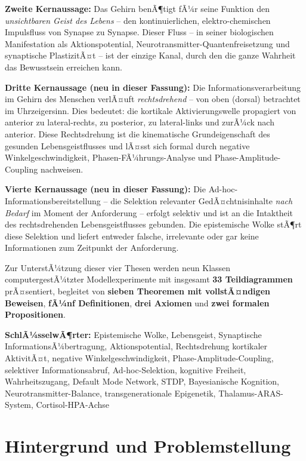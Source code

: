 ﻿\documentclass[12pt,a4paper]{report}
\theoremstyle{plain}
\theoremstyle{definition}
\theoremstyle{remark}
\begin{document}
	\textbf{Zweite Kernaussage:} Das Gehirn benÃ¶tigt fÃ¼r seine Funktion
	den \emph{unsichtbaren Geist des Lebens} -- den kontinuierlichen, elektro-chemischen
	Impulsfluss von Synapse zu Synapse. Dieser Fluss -- in seiner biologischen
	Manifestation als Aktionspotential, Neurotransmitter-Quantenfreisetzung und
	synaptische PlastizitÃ¤t -- ist der einzige Kanal, durch den die ganze
	Wahrheit das Bewusstsein erreichen kann.
	
	\textbf{Dritte Kernaussage (neu in dieser Fassung):} Die Informationsverarbeitung
	im Gehirn des Menschen verlÃ¤uft \emph{rechtsdrehend} -- von oben (dorsal)
	betrachtet im Uhrzeigersinn. Dies bedeutet: die kortikale Aktivierungswelle
	propagiert von anterior zu lateral-rechts, zu posterior, zu lateral-links
	und zurÃ¼ck nach anterior. Diese Rechtsdrehung ist die kinematische
	Grundeigenschaft des gesunden Lebensgeistflusses und lÃ¤sst sich formal
	durch negative Winkelgeschwindigkeit, Phasen-FÃ¼hrungs-Analyse und
	Phase-Amplitude-Coupling nachweisen.
	
	\textbf{Vierte Kernaussage (neu in dieser Fassung):} Die
	Ad-hoc-Informationsbereitstellung -- die Selektion relevanter GedÃ¤chtnisinhalte
	\emph{nach Bedarf} im Moment der Anforderung -- erfolgt selektiv und ist
	an die Intaktheit des rechtsdrehenden Lebensgeistflusses gebunden. Die
	epistemische Wolke stÃ¶rt diese Selektion und liefert entweder falsche,
	irrelevante oder gar keine Informationen zum Zeitpunkt der Anforderung.
	
	Zur UnterstÃ¼tzung dieser vier Thesen werden neun Klassen
	computergestÃ¼tzter Modellexperimente mit insgesamt \textbf{33 Teildiagrammen}
	prÃ¤sentiert, begleitet von \textbf{sieben Theoremen mit vollstÃ¤ndigen Beweisen},
	\textbf{fÃ¼nf Definitionen}, \textbf{drei Axiomen} und
	\textbf{zwei formalen Propositionen}.
	
	\textbf{SchlÃ¼sselwÃ¶rter:}
	Epistemische Wolke, Lebensgeist, Synaptische InformationsÃ¼bertragung,
	Aktionspotential, Rechtsdrehung kortikaler AktivitÃ¤t, negative Winkelgeschwindigkeit,
	Phase-Amplitude-Coupling, selektiver Informationsabruf, Ad-hoc-Selektion,
	kognitive Freiheit, Wahrheitszugang, Default Mode Network, STDP,
	Bayesianische Kognition, Neurotransmitter-Balance, transgenerationale Epigenetik,
	Thalamus-ARAS-System, Cortisol-HPA-Achse
	
	\section{Hintergrund und Problemstellung}
	
\end{document}
